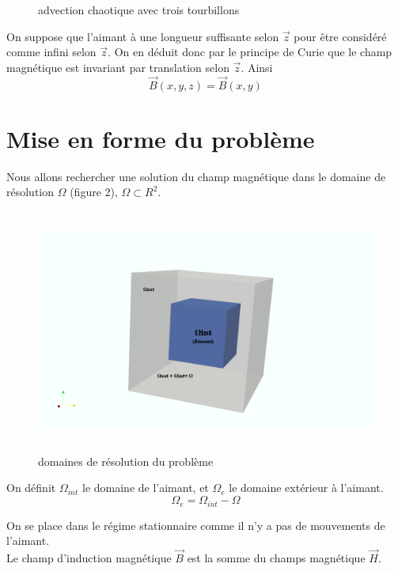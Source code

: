 \documentclass[a4paper,12pt,titlepage]{report}
\begin{document}
\begin{onehalfspace}
\begin{figure}[!h]
\begin{center}
\caption{advection chaotique avec trois tourbillons}
\end{center}
\end{figure}
On suppose que l'aimant à une longueur suffisante selon $\vec{z}$ pour être considéré comme infini selon $\vec{z}$.
On en déduit donc par le principe de Curie que le champ magnétique est invariant par translation selon $\vec{z}$. 
Ainsi \[\vec{B}(x,y,z) = \vec{B}(x,y)\]

\section{Mise en forme du problème}

Nous allons rechercher une solution du champ magnétique dans le domaine de résolution $\Omega$ (figure 2), $\Omega \subset R^{2}$. \\
\begin{figure}[h]
\begin{center}
\includegraphics[height = 8cm, keepaspectratio]{graphes/Espacedetravail.png} 
\caption{domaines de résolution du problème}
\label{figure 2}
\end{center}
\end{figure}
On définit $\Omega_{int}$ le domaine de l'aimant, et $\Omega_{e}$ le domaine extérieur à l'aimant. 
\[\Omega_{e} = \Omega_{int} - \Omega\]

\newpage
On se place dans le régime stationnaire comme il n'y a pas de mouvements de l'aimant. \\
Le champ d'induction magnétique $\vec{B}$ est la somme du champs magnétique $\vec{H}$.


\end{onehalfspace}
\end{document}
